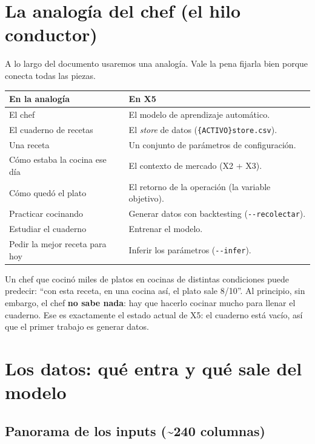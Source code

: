 \documentclass[11pt,a4paper]{report}
\newcommand{\code}[1]{\texttt{\def\_{\textunderscore\allowbreak}#1}}
\begin{document}
\chapter{La analogía del chef (el hilo conductor)}

A lo largo del documento usaremos una analogía. Vale la pena fijarla bien porque conecta todas
las piezas.

\begin{center}
\small
\begin{tabular}{@{}ll@{}}
\toprule
\textbf{En la analogía} & \textbf{En X5} \\
\midrule
El chef & El modelo de aprendizaje automático. \\
El cuaderno de recetas & El \emph{store} de datos (\code{\{ACTIVO\}\_store.csv}). \\
Una receta & Un conjunto de parámetros de configuración. \\
Cómo estaba la cocina ese día & El contexto de mercado (X2 + X3). \\
Cómo quedó el plato & El retorno de la operación (la variable objetivo). \\
Practicar cocinando & Generar datos con backtesting (\code{-{}-recolectar}). \\
Estudiar el cuaderno & Entrenar el modelo. \\
Pedir la mejor receta para hoy & Inferir los parámetros (\code{-{}-infer}). \\
\bottomrule
\end{tabular}
\end{center}

\noindent Un chef que cocinó miles de platos en cocinas de distintas condiciones puede predecir:
``con esta receta, en una cocina así, el plato sale 8/10''. Al principio, sin embargo, el chef
\textbf{no sabe nada}: hay que hacerlo cocinar mucho para llenar el cuaderno. Ese es
exactamente el estado actual de X5: el cuaderno está vacío, así que el primer trabajo es
generar datos.

\chapter{Los datos: qué entra y qué sale del modelo}

\section{Panorama de los inputs (\textasciitilde240 columnas)}
\end{document}
